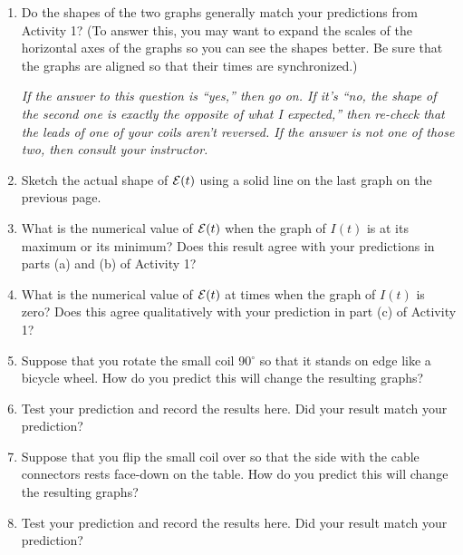 \begin{enumerate}[labparts]
\item Do the shapes of the
two graphs generally match your predictions from Activity 1? (To answer this, you may want to expand the scales of the horizontal axes of the graphs so you can see the shapes better.  Be sure that the graphs are aligned so that their times are synchronized.) 

\answerspace{1in}

\textit{If the answer to this question is ``yes,'' then go on.  If it's ``no,
the shape of the second one is exactly the opposite of what I expected,''
then re-check that the leads of one of your coils aren't reversed. If the answer is not one of those two, then consult your 
instructor.}

\item  Sketch the actual shape of ${\cal E}(t)$ using a solid line on the last graph on the previous page.
\medskip

\item  What is the numerical value of ${\cal E}(t)$ when the graph of $I(t)$ is at its maximum or its minimum?  Does this result agree with your predictions in parts (a) and (b) of Activity 1?
\answerspace{1.0in}

\item  What is the numerical value of ${\cal E}(t)$ at times when the graph of $I(t)$ is zero?  Does this agree qualitatively with your prediction in part (c) of Activity 1?

\answerspace{1in}

\item  Suppose that you rotate the small coil 90$^\circ$ so that it stands on edge like a bicycle wheel.  How do you predict this will change the resulting graphs? 
\answerspace{0.8in}

\item  Test your prediction and record the results here.  Did your result match your prediction?
\answerspace{0.8in}

\item  Suppose that you flip the small coil over so that the side with the cable connectors rests face-down on the table.   How do you predict this will change the resulting graphs? 
\answerspace{0.8in}

\item  Test your prediction and record the results here.  Did your result match your prediction?
\answerspace{0.8in}
\end{enumerate}

